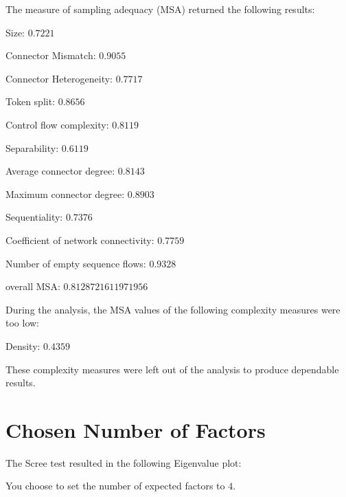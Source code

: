 \documentclass[a4paper]{article}
\begin{document}
The measure of sampling adequacy (MSA) returned the following results:
\begin{compactitem}
\item Size: $0.7221$
\item Connector Mismatch: $0.9055$
\item Connector Heterogeneity: $0.7717$
\item Token split: $0.8656$
\item Control flow complexity: $0.8119$
\item Separability: $0.6119$
\item Average connector degree: $0.8143$
\item Maximum connector degree: $0.8903$
\item Sequentiality: $0.7376$
\item Coefficient of network connectivity: $0.7759$
\item Number of empty sequence flows: $0.9328$
\item overall MSA: $0.8128721611971956$
\end{compactitem}

\noindent
During the analysis, the MSA values of the following complexity measures were too low:
\begin{compactitem}
\item Density: $0.4359$
\end{compactitem}
These complexity measures were left out of the analysis to produce dependable results.

\section*{Chosen Number of Factors}
The Scree test resulted in the following Eigenvalue plot:
\begin{center}
\end{center}
You choose to set the number of expected factors to $4$.
\end{document}
